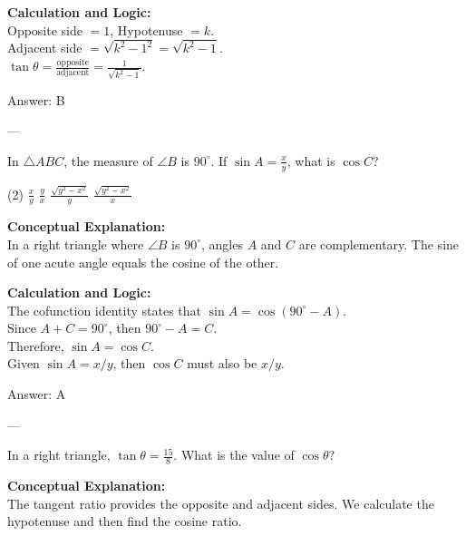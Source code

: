 \documentclass[11pt,paper=a4,answers]{exam}
\begin{document}
\begin{questions}
\begin{solution}
\vspace{10pt}
\textbf{Calculation and Logic:} \\
Opposite side $= 1$, Hypotenuse $= k$. \\
Adjacent side $= \sqrt{k^2 - 1^2} = \sqrt{k^2 - 1}$. \\
$\tan \theta = \frac{\text{opposite}}{\text{adjacent}} = \frac{1}{\sqrt{k^2 - 1}}$.

\vspace{15pt}
Answer: \colorbox{yellow!100}{B}
\end{solution}

---

\question
In $\triangle ABC$, the measure of $\angle B$ is $90^\circ$. If $\sin A = \frac{x}{y}$, what is $\cos C$?
\begin{tasks}(2)
    \task $\frac{x}{y}$
    \task $\frac{y}{x}$
    \task $\frac{\sqrt{y^2-x^2}}{y}$
    \task $\frac{\sqrt{y^2-x^2}}{x}$
\end{tasks}

\begin{solution}
\textbf{Conceptual Explanation:} \\
In a right triangle where $\angle B$ is $90^\circ$, angles $A$ and $C$ are complementary. The sine of one acute angle equals the cosine of the other.

\vspace{10pt}
\textbf{Calculation and Logic:} \\
The cofunction identity states that $\sin A = \cos(90^\circ - A)$. \\
Since $A + C = 90^\circ$, then $90^\circ - A = C$. \\
Therefore, $\sin A = \cos C$. \\
Given $\sin A = x/y$, then $\cos C$ must also be $x/y$.

\vspace{15pt}
Answer: \colorbox{yellow!100}{A}
\end{solution}

---

\question
In a right triangle, $\tan \theta = \frac{15}{8}$. What is the value of $\cos \theta$?

\begin{solution}
\textbf{Conceptual Explanation:} \\
The tangent ratio provides the opposite and adjacent sides. We calculate the hypotenuse and then find the cosine ratio.


\end{solution}
\end{questions}
\end{document}
